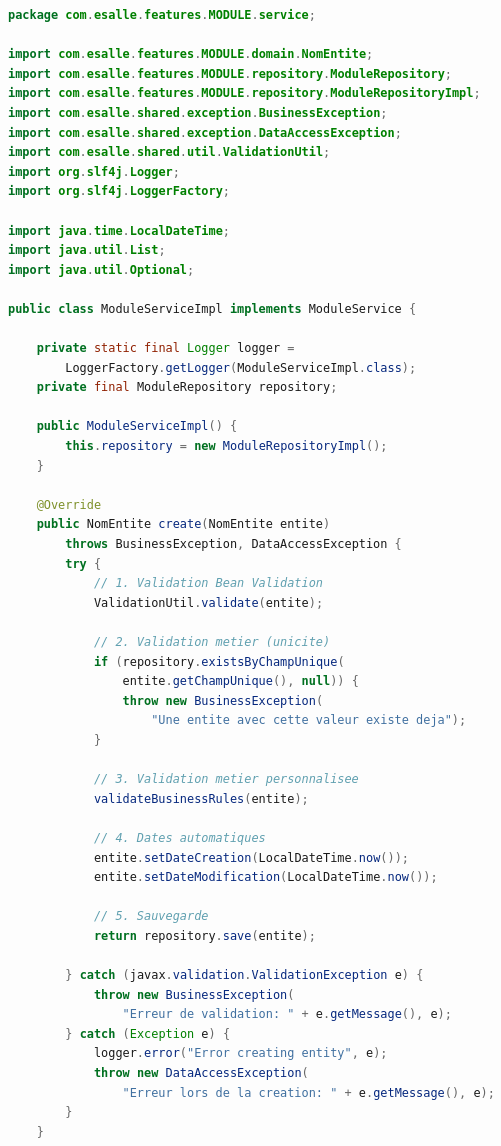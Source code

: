 \documentclass[12pt,a4paper]{article}
\begin{document}
\begin{lstlisting}[language=Java, caption=Template Implementation Service]
package com.esalle.features.MODULE.service;

import com.esalle.features.MODULE.domain.NomEntite;
import com.esalle.features.MODULE.repository.ModuleRepository;
import com.esalle.features.MODULE.repository.ModuleRepositoryImpl;
import com.esalle.shared.exception.BusinessException;
import com.esalle.shared.exception.DataAccessException;
import com.esalle.shared.util.ValidationUtil;
import org.slf4j.Logger;
import org.slf4j.LoggerFactory;

import java.time.LocalDateTime;
import java.util.List;
import java.util.Optional;

public class ModuleServiceImpl implements ModuleService {

    private static final Logger logger = 
        LoggerFactory.getLogger(ModuleServiceImpl.class);
    private final ModuleRepository repository;

    public ModuleServiceImpl() {
        this.repository = new ModuleRepositoryImpl();
    }

    @Override
    public NomEntite create(NomEntite entite) 
        throws BusinessException, DataAccessException {
        try {
            // 1. Validation Bean Validation
            ValidationUtil.validate(entite);
            
            // 2. Validation metier (unicite)
            if (repository.existsByChampUnique(
                entite.getChampUnique(), null)) {
                throw new BusinessException(
                    "Une entite avec cette valeur existe deja");
            }
            
            // 3. Validation metier personnalisee
            validateBusinessRules(entite);
            
            // 4. Dates automatiques
            entite.setDateCreation(LocalDateTime.now());
            entite.setDateModification(LocalDateTime.now());
            
            // 5. Sauvegarde
            return repository.save(entite);
            
        } catch (javax.validation.ValidationException e) {
            throw new BusinessException(
                "Erreur de validation: " + e.getMessage(), e);
        } catch (Exception e) {
            logger.error("Error creating entity", e);
            throw new DataAccessException(
                "Erreur lors de la creation: " + e.getMessage(), e);
        }
    }


\end{lstlisting}
\end{document}
